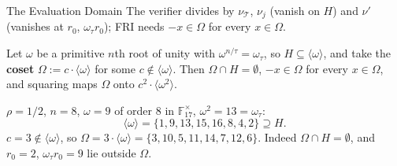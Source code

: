 \documentclass{zkdl-presentation-template}
\begin{document}
    \begin{frame}{The Evaluation Domain}
        The verifier divides by $\nu_{\mathcal{T}}$, $\nu_j$ (vanish on $H$) and $\nu'$ (vanishes at $r_0$, $\omega_\tau r_0$); FRI needs $-x \in \Omega$ for every $x \in \Omega$.
        \pause

        \begin{remark}
            Let $\omega$ be a primitive $n$th root of unity with $\omega^{n/\tau} = \omega_\tau$, so $H \subseteq \langle \omega \rangle$, and take the \textbf{coset} $\Omega := c \cdot \langle \omega \rangle$ for some $c \notin \langle \omega \rangle$. Then $\Omega \cap H = \emptyset$, $-x \in \Omega$ for every $x \in \Omega$, and squaring maps $\Omega$ onto $c^2 \cdot \langle \omega^2 \rangle$.
        \end{remark}
        \pause

        \begin{example}
            $\rho = 1/2$, $n = 8$, $\omega = 9$ of order $8$ in $\mathbb{F}_{17}^\times$, $\omega^2 = 13 = \omega_\tau$:
            \begin{equation*}
                \langle \omega \rangle = \{1, 9, 13, 15, 16, 8, 4, 2\} \supseteq H.
            \end{equation*}
            $c = 3 \notin \langle \omega \rangle$, so $\Omega = 3 \cdot \langle \omega \rangle = \{3, 10, 5, 11, 14, 7, 12, 6\}$. Indeed $\Omega \cap H = \emptyset$, and $r_0 = 2$, $\omega_\tau r_0 = 9$ lie outside $\Omega$.
        \end{example}
    \end{frame}
\end{document}
